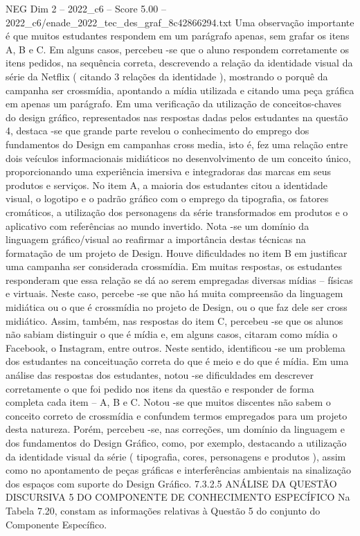 \begin{textsample}{NEG Dim 2 – 2022\_c6 – Score 5.00 – 2022\_c6/enade\_2022\_tec\_des\_graf\_8c42866294.txt}
Uma observação importante é que muitos estudantes respondem em um parágrafo apenas, sem grafar os itens A, B e C.
Em alguns casos, percebeu -se que o aluno respondem corretamente os itens pedidos, na sequência correta, descrevendo a relação da identidade visual da série da Netflix ( citando 3 relações da identidade ), mostrando o porquê da campanha ser crossmídia, apontando a mídia utilizada e citando uma peça gráfica em apenas um parágrafo.
Em uma verificação da utilização de conceitos-chaves do design gráfico, representados nas respostas dadas pelos estudantes na questão 4, destaca -se que grande parte revelou o conhecimento do emprego dos fundamentos do Design em campanhas cross media, isto é, fez uma relação entre dois veículos informacionais midiáticos no desenvolvimento de um conceito único, proporcionando uma experiência imersiva e integradoras das marcas em seus produtos e serviços.
No item A, a maioria dos estudantes citou a identidade visual, o logotipo e o padrão gráfico com o emprego da tipografia, os fatores cromáticos, a utilização dos personagens da série transformados em produtos e o aplicativo com referências ao mundo invertido.
Nota -se um domínio da linguagem gráfico/visual ao reafirmar a importância destas técnicas na formatação de um projeto de Design.
Houve dificuldades no item B em justificar uma campanha ser considerada crossmídia.
Em muitas respostas, os estudantes responderam que essa relação se dá ao serem empregadas diversas mídias – físicas e virtuais.
Neste caso, percebe -se que não há muita compreensão da linguagem midiática ou o que é crossmídia no projeto de Design, ou o que faz dele ser cross midiático.
Assim, também, nas respostas do item C, percebeu -se que os alunos não sabiam distinguir o que é mídia e, em alguns casos, citaram como mídia o Facebook, o Instagram, entre outros.
Neste sentido, identificou -se um problema dos estudantes na conceituação correta do que é meio e do que é mídia.
Em uma análise das respostas dos estudantes, notou -se dificuldades em descrever corretamente o que foi pedido nos itens da questão e responder de forma completa cada item – A, B e C.
Notou -se que muitos discentes não sabem o conceito correto de crossmídia e confundem termos empregados para um projeto desta natureza.
Porém, percebeu -se, nas correções, um domínio da linguagem e dos fundamentos do Design Gráfico, como, por exemplo, destacando a utilização da identidade visual da série ( tipografia, cores, personagens e produtos ), assim como no apontamento de peças gráficas e interferências ambientais na sinalização dos espaços com suporte do Design Gráfico. 7.3.2.5 ANÁLISE DA QUESTÃO DISCURSIVA 5 DO COMPONENTE DE CONHECIMENTO ESPECÍFICO Na Tabela 7.20, constam as informações relativas à Questão 5 do conjunto do Componente Específico.

\end{textsample}
